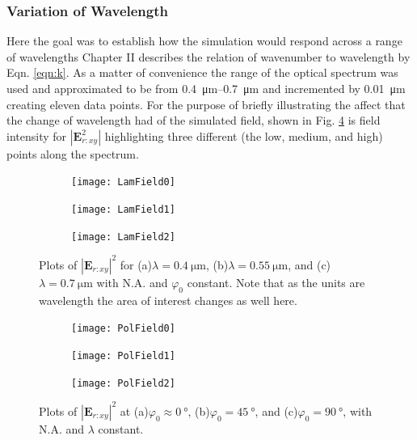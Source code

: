 \documentclass[12pt,a4paper]{article}
\begin{document}
\subsubsection{Variation of Wavelength}
Here the goal was to establish how the simulation would respond across a range of wavelengths Chapter II describes the relation of wavenumber to wavelength by Eqn. \ref{eqn:k}. As a matter of convenience the range of the optical spectrum was used and approximated to be from \SIrange{0.4}{0.7}{\micro\metre} and incremented by \SI{0.01}{\micro\meter} creating eleven data points. For the purpose of briefly illustrating the affect that the change of wavelength had of the simulated field, shown in Fig. \ref{fig:LamFields} is field intensity for $|\textbf{E}^2_{r:xy}|$ highlighting three different (the low, medium, and high) points along the spectrum.

\begin{figure}[htp]
     \centering
     \begin{subfigure}[b]{0.32\textwidth}
         \centering
         \texttt{[image: LamField0]}
         \caption{}
         \label{fig:LamField1}
     \end{subfigure}
     \hfill
     \begin{subfigure}[b]{0.32\textwidth}
         \centering
         \texttt{[image: LamField1]}
         \caption{}
         \label{fig:LamField2}
     \end{subfigure}
     \hfill
     \begin{subfigure}[b]{0.32\textwidth}
         \centering
         \texttt{[image: LamField2]}
         \caption{}
         \label{fig:LamField3}
     \end{subfigure}
        \caption{Plots of $|\textbf{E}_{r:xy}|^2$ for (a)$\lambda = \SI{0.4}{\micro\meter}$, (b)$\lambda = \SI{0.55}{\micro\meter}$, and (c)$\lambda = \SI{0.7}{\micro\meter}$ with N.A. and $\varphi_0$ constant. Note that as the units are wavelength the area of interest changes as well here.}
        \label{fig:LamFields}
\end{figure}

\begin{figure}[htp]
     \centering
     \begin{subfigure}[b]{0.32\textwidth}
         \centering
         \texttt{[image: PolField0]}
         \caption{}
         \label{fig:PolField0}
     \end{subfigure}
     \hfill
     \begin{subfigure}[b]{0.32\textwidth}
         \centering
         \texttt{[image: PolField1]}
         \caption{}
         \label{fig:PolField1}
     \end{subfigure}
     \hfill
     \begin{subfigure}[b]{0.32\textwidth}
         \centering
         \texttt{[image: PolField2]}
         \caption{}
         \label{fig:PolField2}
     \end{subfigure}
        \caption{Plots of $|\textbf{E}_{r:xy}|^2$ at (a)$\varphi_0\approx \SI{0}{\degree}$, (b)$\varphi_0 = \SI{45}{\degree}$, and (c)$\varphi_0 = \SI{90}{\degree}$, with N.A. and $\lambda$ constant.}
        \label{fig:PolFields}
\end{figure}
\end{document}
